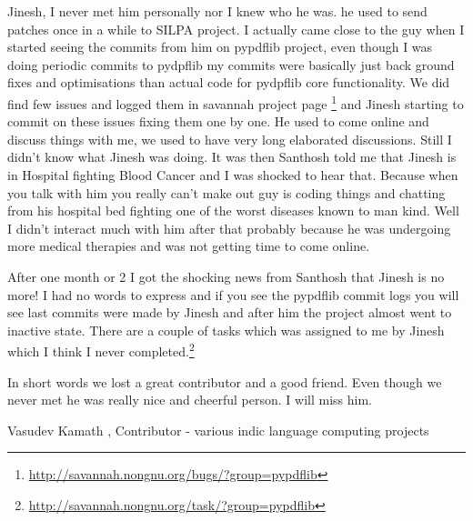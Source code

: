 \newpage
{}

Jinesh, I never met him personally nor I knew who he was. he used to
send patches once in a while to SILPA project. I actually came close
to the guy when I started seeing the commits from him on pypdflib
project, even though I was doing periodic commits to pydpflib my
commits were basically just back ground fixes and optimisations than
actual code for pydpflib core functionality. We did find few issues
and logged them in savannah project page \footnote{\url{http://savannah.nongnu.org/bugs/?group=pypdflib}} and Jinesh starting to
commit on these issues fixing them one by one. He used to come online
and discuss things with me, we used to have very long elaborated
discussions. Still I didn't know what Jinesh was doing. It was then
Santhosh told me that Jinesh is in Hospital fighting Blood Cancer and
I was shocked to hear that. Because when you talk with him you really
can't make out guy is coding things and chatting from his hospital bed
fighting one of the worst diseases known to man kind. Well I didn't
interact much with him after that probably because he was undergoing
more medical therapies and was not getting time to come online.

After one month or 2 I got the shocking news from Santhosh that Jinesh
is no more! I had no words to express and if you see the pypdflib
commit logs you will see last commits were made by Jinesh and after
him the project almost went to inactive state. There are a couple of
tasks which was assigned to me by Jinesh which I think I never
completed.\footnote{\url{http://savannah.nongnu.org/task/?group=pypdflib}}

In short words we lost a great contributor and a good friend. Even
though we never met he was really nice and cheerful person. I will
miss him.

Vasudev Kamath , Contributor - various indic language computing projects
 

